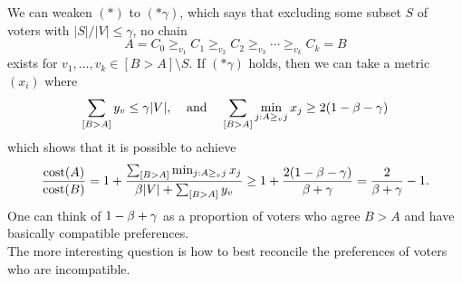 \documentclass{amsart}
\DeclareMathOperator{\cost}{\rm{cost}}
\begin{document}
We can weaken $(\ast)$ to $(\ast \gamma)$, which says that excluding some subset $S$ of voters with $|S|/|V| \leq \gamma$, no chain 
$$
A = C_0\geq_{v_1} C_1 \geq_{v_2} C_2 \geq_{v_3} \cdots \geq_{v_{k}} C_{k} = B
$$
exists for $v_1,\dots,v_k\in [B>A]\setminus S$. If $(\ast \gamma)$ holds, then we can take a metric $(x_i)$ where 
$$
\sum_{[B>A]} y_v \leq \gamma|V|, \;\;\;\; \text{and} \;\;\;\; \sum_{[B>A]} \min_{j:A\geq_v j} x_j \geq 2(1-\beta -\gamma)
$$
which shows that it is possible to achieve
$$
\frac{\cost(A)}{\cost(B)} = 1 + \frac{\sum_{[B>A]} \min_{j:A\geq_v j} x_j}{ \b |V| + \sum_{[B>A]} y_v} \geq 1 + \frac{2(1-\b - \gamma)}{\b + \gamma} = \frac{2}{\b + \gamma} - 1.
$$
One can think of $1-\beta + \gamma$ as a proportion of voters who agree $B>A$ and have basically compatible preferences.\\

The more interesting question is how to best reconcile the preferences of voters who are incompatible.
\end{document}
